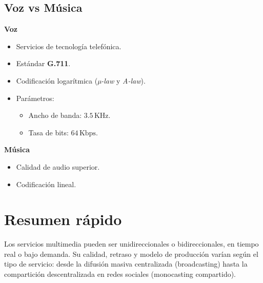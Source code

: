 \documentclass[11pt,a4paper]{article}
\begin{document}
\subsection*{Voz vs Música}

\textbf{Voz}
\begin{itemize}
    \item Servicios de tecnología telefónica.
    \item Estándar \textbf{G.711}.
    \item Codificación logarítmica (\textit{µ-law} y \textit{A-law}).
    \item Parámetros:
    \begin{itemize}
        \item Ancho de banda: $3.5 \,\text{KHz}$.
        \item Tasa de bits: $64 \,\text{Kbps}$.
    \end{itemize}
\end{itemize}

\textbf{Música}
\begin{itemize}
    \item Calidad de audio superior.
    \item Codificación lineal.
\end{itemize}

\section{Resumen rápido}

\begin{ResumenBox}
Los servicios multimedia pueden ser unidireccionales o bidireccionales, en tiempo real o bajo demanda. Su calidad, retraso y modelo de producción varían según el tipo de servicio: desde la difusión masiva centralizada (broadcasting) hasta la compartición descentralizada en redes sociales (monocasting compartido).
\end{ResumenBox}
\end{document}
